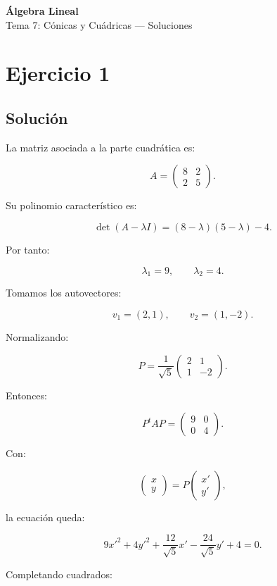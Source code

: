 \documentclass[11pt,a4paper]{article}
\begin{document}
\begin{center}
{\LARGE\bfseries Álgebra Lineal}\\[0.4em]
{\Large Tema 7: Cónicas y Cuádricas --- Soluciones}
\end{center}

\section{Ejercicio 1}
\subsection{Solución}

La matriz asociada a la parte cuadrática es:

\[
A=
\begin{pmatrix}
8&2\\
2&5
\end{pmatrix}.
\]

Su polinomio característico es:

\[
\det(A-\lambda I)
=
(8-\lambda)(5-\lambda)-4.
\]

Por tanto:

\[
\lambda_1=9,
\qquad
\lambda_2=4.
\]

Tomamos los autovectores:

\[
v_1=(2,1),
\qquad
v_2=(1,-2).
\]

Normalizando:

\[
P=
\frac1{\sqrt5}
\begin{pmatrix}
2&1\\
1&-2
\end{pmatrix}.
\]

Entonces:

\[
P^tAP=
\begin{pmatrix}
9&0\\
0&4
\end{pmatrix}.
\]

Con:

\[
\begin{pmatrix}
x\\y
\end{pmatrix}
=
P
\begin{pmatrix}
x'\\y'
\end{pmatrix},
\]

la ecuación queda:

\[
9x'^2+4y'^2
+
\frac{12}{\sqrt5}x'
-
\frac{24}{\sqrt5}y'
+4=0.
\]

Completando cuadrados:
\end{document}
